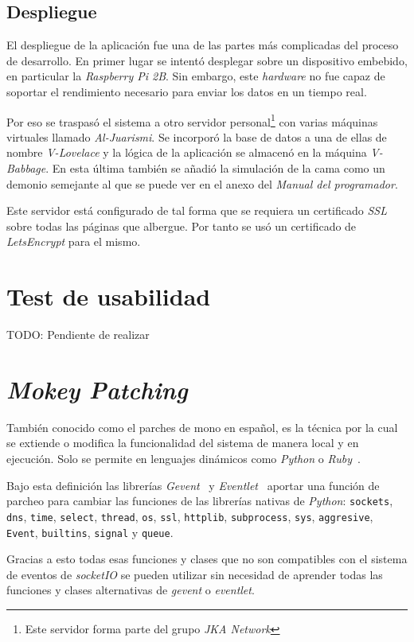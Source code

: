 \subsection{Despliegue}
El despliegue de la aplicación fue una de las partes más complicadas del proceso de desarrollo. En primer lugar se intentó desplegar sobre un dispositivo embebido, en particular la \textit{Raspberry Pi 2B}. Sin embargo, este \textit{hardware} no fue capaz de soportar el rendimiento necesario para enviar los datos en un tiempo real.

Por eso se traspasó el sistema a otro servidor personal\footnote{Este servidor forma parte del grupo \textit{JKA Network}} con varias máquinas virtuales llamado \textit{Al-Juarismi}. Se incorporó la base de datos a una de ellas de nombre \textit{V-Lovelace} y la lógica de la aplicación se almacenó en la máquina \textit{V-Babbage}. En esta última también se añadió la simulación de la cama como un demonio semejante al que se puede ver en el anexo del \textit{Manual del programador}. %

Este servidor está configurado de tal forma que se requiera un certificado \textit{SSL} sobre todas las páginas que albergue. Por tanto se usó un certificado de \textit{LetsEncrypt} para el mismo.

\section{Test de usabilidad}

TODO: Pendiente de realizar

\section{\textit{Mokey Patching}}\label{cap:mokey}

También conocido como el parches de mono en español, es la técnica por la cual se extiende o modifica la funcionalidad del sistema de manera local y en ejecución. Solo se permite en lenguajes dinámicos como \textit{Python} o \textit{Ruby}~\cite{wiki:monkey_patch}.

Bajo esta definición las librerías \textit{Gevent}~\cite{tool:gevent} y \textit{Eventlet}~\cite{tool:eventlet} aportar una función de parcheo para cambiar las funciones de las librerías nativas de \textit{Python}: \texttt{sockets}, \texttt{dns}, \texttt{time}, \texttt{select}, \texttt{thread}, \texttt{os}, \texttt{ssl}, \texttt{httplib}, \texttt{subprocess}, \texttt{sys}, \texttt{aggresive}, \texttt{Event}, \texttt{builtins}, \texttt{signal} y \texttt{queue}.

Gracias a esto todas esas funciones y clases que no son compatibles con el sistema de eventos de \textit{socketIO} se pueden utilizar sin necesidad de aprender todas las funciones y clases alternativas de \textit{gevent} o \textit{eventlet}.

